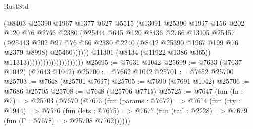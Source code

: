 \begin{lexlean}{RustStd}
\begin{coremodule}
{\begin{coremodule}
{{{{{{{{{{{{{{{{{{{{{{{{{{{{{{{{{{{{{{{{{{{{{{{{{{{{{                                                  (@8403
                                                    @25390
                                                    @1967
                                                    @1377
                                                    @627
                                                    @5515
                                                    (@13091
                                                      @25390
                                                      @1967
                                                      @156
                                                      @202
                                                      @120
                                                      @76
                                                      @2766
                                                      @2380
                                                      (@25444
                                                        @645
                                                        @120
                                                        @8436
                                                        @2766
                                                        @13105
                                                        @25457
                                                        (@25443
                                                          @202
                                                          @97
                                                          @76
                                                          @66
                                                          @2380
                                                          @2240
                                                          (@8412 @25390 @1967 @199 @76 @2379 @8998)
                                                          @25460))))))
                                              @11301
                                              (@8134 (@11922 @1386 @365))
                                              @11313)))))))))))))))))))))
@25695 := @7631 @1042
@25699 := @7633 (@7637 @1042) (@7643 @1042)
@25700 := @7662 @1042
@25701 := @7652 @25700
@25703 := @7648 (@25701 @7667)
@25705 := @7690 (@7691 @1042)
@25706 := @7686 @25705
@25708 := @7648 (@25706 @7715)
@25725 := @7647
    (fun (fn : @7) =>
    @25703
      (@7670
        (@7673
          (fun (params : @7672) =>
          @7674
            (fun (rty : @1944) =>
            @7676
              (fun (lets : @7675) =>
              @7677 (fun (tail : @2228) => @7679 (fun (Γ : @7678) => @25708 @7762))))))
}}}}}}}}}}}}}}}}}}}}}}}}}}}}}}}}}}}}}}}}}}}}}}}}}}}}}
\end{coremodule}}
\end{coremodule}
\end{lexlean}
